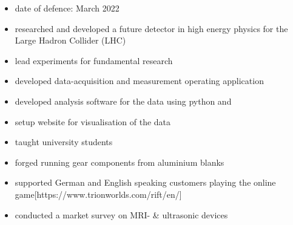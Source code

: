 
\begin{itemize}
  \item date of defence: March 2022
  \item researched and developed a future detector in high energy physics for the Large Hadron Collider (LHC)
  \item lead experiments for fundamental research
  \item developed data-acquisition and measurement operating application
  \item developed analysis software for the data using python and \cpp
  \item setup website for visualisation of the data
  \item taught university students
\end{itemize}

\divider

\begin{itemize}
	\item forged running gear components from aluminium blanks
\end{itemize}

\divider

\begin{itemize}
	\item supported German and English speaking customers playing the online game[https://www.trionworlds.com/rift/en/]
\end{itemize}

\divider

\begin{itemize}
	\item conducted a market survey on MRI- \& ultrasonic devices
\end{itemize}
